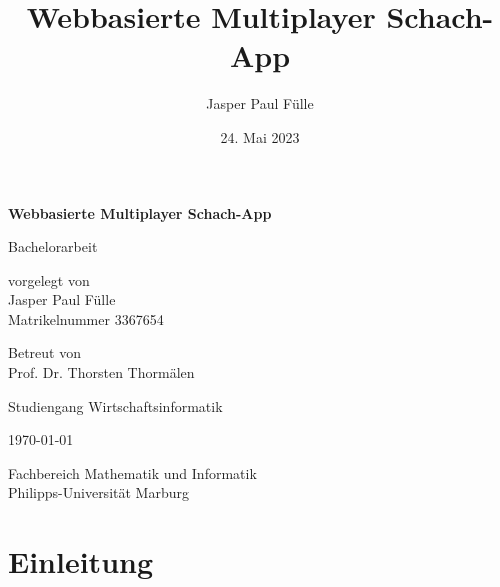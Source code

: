 \documentclass[a4paper,12pt]{report}
\title{Webbasierte Multiplayer Schach-App}
\author{Jasper Paul Fülle}
\date{24. Mai 2023}
\begin{document}
\begin{titlepage}
    \begin{center}
        \vspace*{1cm}
        
        \Large
        \textbf{Webbasierte Multiplayer Schach-App}
        
        \vspace{0.5cm}
        
        Bachelorarbeit
        
        \vspace{1.5cm}
        
        \normalsize
        vorgelegt von\\
        Jasper Paul Fülle\\
        Matrikelnummer 3367654
        
        \vspace{1cm}
        
        Betreut von\\
        Prof. Dr. Thorsten Thormälen
        
        \vspace{1cm}
        
        Studiengang  Wirtschaftsinformatik 
        
        \vspace{1cm}
        
        \today
        
        \vfill
        
        
        \vspace{0.5cm}
        
        Fachbereich Mathematik und Informatik\\
        Philipps-Universität Marburg
    \end{center}
\end{titlepage}

\tableofcontents

\chapter{Einleitung}
\end{document}
